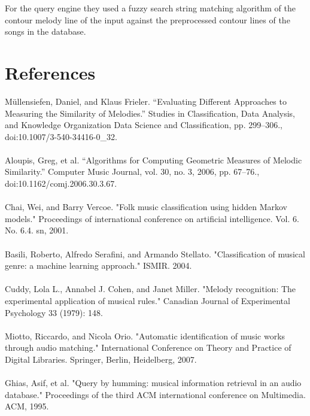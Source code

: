 \documentclass{article}
\begin{document}
	For the query engine they used a fuzzy search string matching algorithm of the contour melody line of the input against the preprocessed contour lines of the songs in the database. 
	
	\section{References}
 	Müllensiefen, Daniel, and Klaus Frieler. “Evaluating Different Approaches to Measuring the Similarity of Melodies.” Studies in Classification, Data Analysis, and Knowledge Organization Data Science and Classification, pp. 299–306., doi:10.1007/3-540-34416-0\_32.
	\\ \\
	Aloupis, Greg, et al. “Algorithms for Computing Geometric Measures of Melodic Similarity.” Computer Music Journal, vol. 30, no. 3, 2006, pp. 67–76., \\doi:10.1162/comj.2006.30.3.67.
	\\ \\
	Chai, Wei, and Barry Vercoe. "Folk music classification using hidden Markov models." Proceedings of international conference on artificial intelligence. Vol. 6. No. 6.4. sn, 2001.
	\\ \\
	Basili, Roberto, Alfredo Serafini, and Armando Stellato. "Classification of musical genre: a machine learning approach." ISMIR. 2004.
	\\ \\
	Cuddy, Lola L., Annabel J. Cohen, and Janet Miller. "Melody recognition: The experimental application of musical rules." Canadian Journal of Experimental Psychology 33 (1979): 148.
	\\ \\
	Miotto, Riccardo, and Nicola Orio. "Automatic identification of music works through audio matching." International Conference on Theory and Practice of Digital Libraries. Springer, Berlin, Heidelberg, 2007.
	\\ \\
	Ghias, Asif, et al. "Query by humming: musical information retrieval in an audio database." Proceedings of the third ACM international conference on Multimedia. ACM, 1995.
	\\
\end{document}
